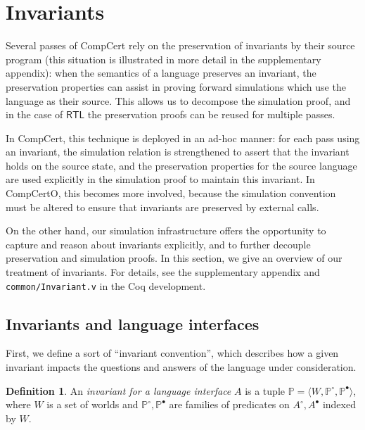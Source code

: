 \documentclass[11pt,oneside,draft]{book}
\theoremstyle{definition}
\newtheorem{definition}[theorem]{Definition}
\newcommand{\kw}[1]{\ensuremath{ \mathsf{#1} }}
\newcommand{\que}{\circ}         %
\newcommand{\ans}{\bullet}       %
\begin{document}


\section{Invariants} \label{sec:inv} %


Several passes of CompCert
rely on the preservation of invariants
by their source program
(this situation is illustrated in more detail in the supplementary
appendix):
when the semantics of a language preserves an invariant,
the preservation properties can assist
in proving forward simulations
which use the language as their source.
This allows us to decompose the simulation proof,
and in the case of $\kw{RTL}$
the preservation proofs can be reused for multiple passes.

In CompCert,
this technique is deployed in an ad-hoc manner:
for each pass using an invariant,
the simulation relation is strengthened to assert that
the invariant holds on the source state,
and the preservation properties for the source language
are used explicitly in the simulation proof
to maintain this invariant.
In CompCertO,
this becomes more involved,
because the simulation convention must be altered
to ensure that invariants are preserved
by external calls.

On the other hand,
our simulation infrastructure offers the opportunity
to capture and reason about invariants explicitly,
and to further decouple preservation and simulation proofs.
In this section,
we give an overview of our treatment of invariants.
For details,
see the supplementary appendix and
\texttt{common/Invariant.v}
in the Coq development.


\subsection{Invariants and language interfaces} %

First, we define a sort of ``invariant convention'',
which describes how a given invariant impacts the questions and answers
of the language under consideration.

\begin{definition} %
An \emph{invariant for a language interface} $A$
is a tuple
$\mathbb{P} = \langle W, \mathbb{P}^\que, \mathbb{P}^\ans \rangle$,
where $W$ is a set of worlds
and $\mathbb{P}^\que, \mathbb{P}^\ans$
are families of predicates on $A^\que, A^\ans$
indexed by $W$.
\end{definition}
\end{document}
